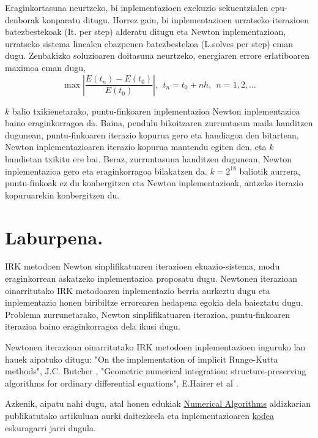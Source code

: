 Eraginkortasuna neurtzeko, bi inplementazioen exekuzio sekuentzialen cpu-denborak  konparatu ditugu. Horrez gain, bi inplementazioen urratseko iterazioen batezbestekoak (It. per step) alderatu ditugu eta Newton inplementazioan, urratseko sistema linealen ebazpenen batezbestekoa (L.solves per step) eman dugu. Zenbakizko soluzioaren doitasuna neurtzeko, energiaren errore erlatiboaren maximoa eman dugu,
\begin{equation*}
\max | \frac{E(t_n)-E(t_0)}{E(t_0)}|, \ \  t_n=t_0+nh, \ \ n=1,2,\dots
\end{equation*} 

$k$ balio txikienetarako, puntu-finkoaren inplementazioa Newton inplementazioa baino eraginkorragoa da. Baina, pendulu bikoitzaren zurruntasun maila handitzen dugunean, puntu-finkoaren iterazio kopurua gero eta handiagoa den bitartean, Newton inplementazioaren iterazio kopurua mantendu egiten den, eta $k$ handietan txikitu ere bai. Beraz, zurruntasuna handitzen dugunean, Newton inplementazioa gero eta eraginkorragoa bilakatzen da. $k=2^{18}$ baliotik aurrera, puntu-finkoak ez du konbergitzen eta Newton inplementazioak, antzeko iterazio kopuruarekin konbergitzen du.

 



\section{Laburpena.}

IRK metodoen Newton sinplifikatuaren iterazioen ekuazio-sistema, modu eraginkorrean askatzeko inplementazioa proposatu dugu. Newtonen iterazioan oinarritutako IRK metodoaren inplementazio berria aurkeztu dugu eta inplementazio honen biribiltze errorearen hedapena egokia dela baieztatu dugu. Problema zurrunetarako, Newton sinplifikatuaren iterazioa, puntu-finkoaren iterazioa baino eraginkorragoa dela ikusi dugu.

Newtonen iterazioan oinarritutako IRK metodoen inplementazioen inguruko lan hauek aipatuko ditugu: "On the implementation of implicit Runge-Kutta methods", J.C. Butcher \cite{Butcher1976}, "Geometric numerical integration: structure-preserving algorithms for ordinary differential equations", E.Hairer et al \cite{Hairer2006}.

Azkenik, aipatu nahi dugu, atal honen edukiak \href{http://link.springer.com/journal/11075}{Numerical Algorithms} aldizkarian publikatutako \cite{Antonana2017a} artikuluan aurki daitezkeela eta inplementazioaren \href{https://github.com/mikelehu/IRK-Newton}{kodea} eskuragarri jarri dugula.
